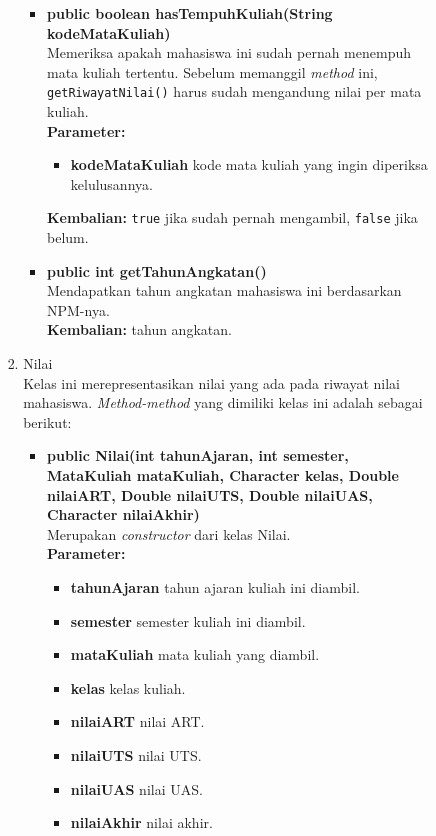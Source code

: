 \documentclass[a4paper,twoside]{article}
\begin{document}
\begin{enumerate}
\begin{enumerate}
\begin{enumerate}
\begin{enumerate}
\begin{itemize}
			\item \textbf{public boolean hasTempuhKuliah(String kodeMataKuliah)}\\
				Memeriksa apakah mahasiswa ini sudah pernah menempuh mata kuliah tertentu. Sebelum memanggil \textit{method} ini, \texttt{getRiwayatNilai()} harus sudah mengandung nilai per mata kuliah.\\
				\textbf{Parameter:}
				\begin{itemize}
					\item \textbf{kodeMataKuliah} kode mata kuliah yang ingin diperiksa kelulusannya.
				\end{itemize}
				\textbf{Kembalian:} \texttt{true} jika sudah pernah mengambil, \texttt{false} jika belum.
			
			\item \textbf{public int getTahunAngkatan()}\\
				Mendapatkan tahun angkatan mahasiswa ini berdasarkan NPM-nya.\\
				\textbf{Kembalian:} tahun angkatan.
			\end{itemize}
		
		\item Nilai\\
		Kelas ini merepresentasikan nilai yang ada pada riwayat nilai mahasiswa. \textit{Method-method} yang dimiliki kelas ini adalah sebagai berikut:
		\begin{itemize}
			\item \textbf{public Nilai(int tahunAjaran, int semester, MataKuliah mataKuliah, Character kelas, Double nilaiART, Double nilaiUTS, Double nilaiUAS, Character nilaiAkhir)}\\
				Merupakan \textit{constructor} dari kelas Nilai.\\
				\textbf{Parameter:}
				\begin{itemize}
					\item \textbf{tahunAjaran} tahun ajaran kuliah ini diambil.
					\item \textbf{semester} semester kuliah ini diambil.
					\item \textbf{mataKuliah} mata kuliah yang diambil.
					\item \textbf{kelas} kelas kuliah.
					\item \textbf{nilaiART} nilai ART.
					\item \textbf{nilaiUTS} nilai UTS.
					\item \textbf{nilaiUAS} nilai UAS.
					\item \textbf{nilaiAkhir} nilai akhir.
				\end{itemize}
				

\end{itemize}
\end{enumerate}
\end{enumerate}
\end{enumerate}
\end{enumerate}
\end{document}
